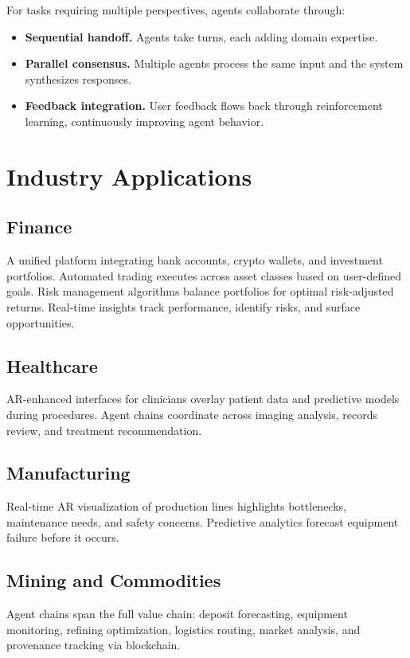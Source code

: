 \documentclass[11pt,twocolumn]{article}
\begin{document}
For tasks requiring multiple perspectives, agents collaborate through:

\begin{itemize}[leftmargin=1.1em]
    \item \textbf{Sequential handoff.} Agents take turns, each adding domain
    expertise.
    \item \textbf{Parallel consensus.} Multiple agents process the same input
    and the system synthesizes responses.
    \item \textbf{Feedback integration.} User feedback flows back through
    reinforcement learning, continuously improving agent behavior.
\end{itemize}

\section{Industry Applications}
\label{sec:industries}

\subsection{Finance}
A unified platform integrating bank accounts, crypto wallets, and investment
portfolios. Automated trading executes across asset classes based on user-defined
goals. Risk management algorithms balance portfolios for optimal risk-adjusted
returns. Real-time insights track performance, identify risks, and surface
opportunities.

\subsection{Healthcare}
AR-enhanced interfaces for clinicians overlay patient data and predictive models
during procedures. Agent chains coordinate across imaging analysis, records
review, and treatment recommendation.

\subsection{Manufacturing}
Real-time AR visualization of production lines highlights bottlenecks,
maintenance needs, and safety concerns. Predictive analytics forecast equipment
failure before it occurs.

\subsection{Mining and Commodities}
Agent chains span the full value chain: deposit forecasting, equipment
monitoring, refining optimization, logistics routing, market analysis, and
provenance tracking via blockchain.
\end{document}

